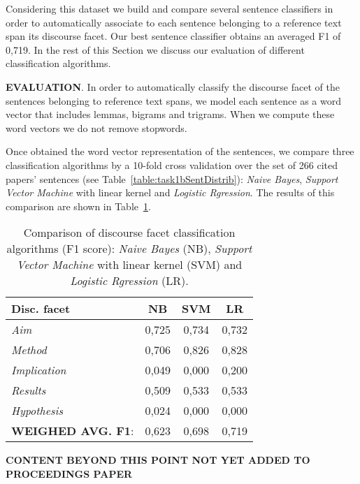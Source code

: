 \documentclass[11pt]{article}
\begin{document}
Considering this dataset we build and compare several sentence classifiers in order to automatically associate to each sentence belonging to a reference text span its discourse facet. Our best sentence classifier obtains an averaged F1 of 0,719. In the rest of this Section we discuss our evaluation of different classification algorithms.

\textbf{EVALUATION}. In order to automatically classify the discourse facet of the sentences belonging to reference text spans, we model each sentence as a word vector that includes lemmas, bigrams and trigrams. When we compute these word vectors we do not remove stopwords.

Once obtained the word vector representation of the sentences, we compare three classification algorithms by a 10-fold cross validation over the set of 
266 cited papers' sentences (see Table~\ref{table:task1bSentDistrib}): \textit{Naive Bayes}, \textit{Support Vector Machine} with linear kernel and \textit{Logistic Rgression}. The results of this comparison are shown in Table~\ref{table:task1bAlgorithmComp}.

\begin{table}[h]\footnotesize
  \begin{center}
  \begin{tabular}{ l | c | c | c}
    \hline
    Disc. facet & NB & SVM & LR \\ \hline
    \textit{Aim} & 0,725 & 0,734 & 0,732 \\ \hline
    \textit{Method} & 0,706 & 0,826 & 0,828 \\ \hline
    \textit{Implication} & 0,049 & 0,000 & 0,200 \\ \hline
    \textit{Results} & 0,509 & 0,533 & 0,533 \\ \hline
    \textit{Hypothesis} & 0,024 & 0,000 & 0,000 \\ \hline
    \textbf{WEIGHED AVG. F1}: & 0,623 & 0,698 & 0,719 \\ \hline
    \hline
  \end{tabular}
  \caption{Comparison of discourse facet classification algorithms (F1 score): \textit{Naive Bayes} (NB), \textit{Support Vector Machine} with linear kernel (SVM) and \textit{Logistic Rgression} (LR).}
  \label{table:task1bAlgorithmComp}
  \end{center}
\end{table}

\textbf{CONTENT BEYOND THIS POINT NOT YET ADDED TO PROCEEDINGS PAPER}\\
\end{document}
